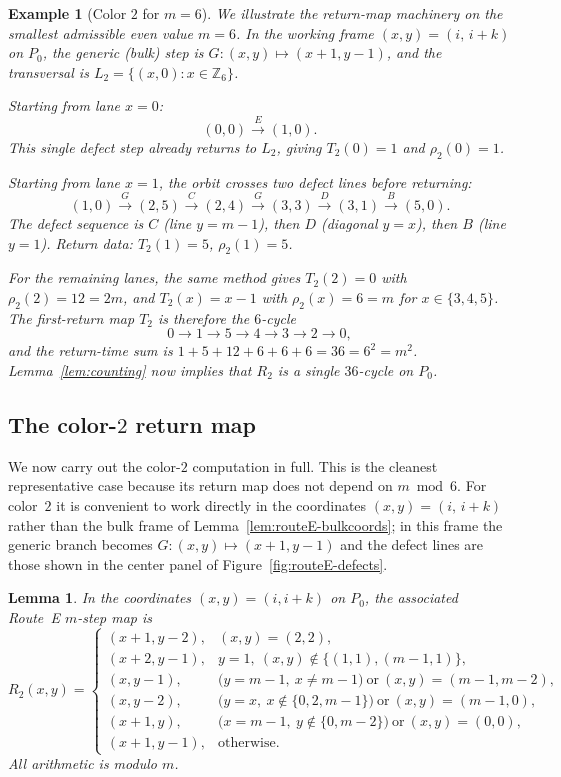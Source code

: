 \documentclass[11pt]{article}
\newtheorem{lemma}{Lemma}
\newtheorem{example}{Example}
\begin{document}
\begin{example}[Color $2$ for $m=6$]\label{ex:m6-color2}
We illustrate the return-map machinery on the smallest admissible even value $m=6$.
In the working frame $(x,y)=(i,\,i+k)$ on $P_0$, the generic (bulk) step is $G\colon(x,y)\mapsto(x+1,y-1)$, and the transversal is $L_2=\{(x,0):x\in\mathbb Z_6\}$.

Starting from lane $x=0$:
\[
(0,0)\xrightarrow{E}(1,0).
\]
This single defect step already returns to $L_2$, giving $T_2(0)=1$ and $\rho_2(0)=1$.

Starting from lane $x=1$, the orbit crosses two defect lines before returning:
\[
(1,0)\xrightarrow{G}(2,5)\xrightarrow{C}(2,4)\xrightarrow{G}(3,3)
\xrightarrow{D}(3,1)\xrightarrow{B}(5,0).
\]
The defect sequence is $C$ (line $y=m{-}1$), then $D$ (diagonal $y=x$), then $B$ (line $y=1$).
Return data: $T_2(1)=5$, $\rho_2(1)=5$.

For the remaining lanes, the same method gives $T_2(2)=0$ with $\rho_2(2)=12=2m$, and $T_2(x)=x-1$ with $\rho_2(x)=6=m$ for $x\in\{3,4,5\}$.
The first-return map $T_2$ is therefore the $6$-cycle
\[
0\to 1\to 5\to 4\to 3\to 2\to 0,
\]
and the return-time sum is $1+5+12+6+6+6=36=6^2=m^2$.
Lemma~\ref{lem:counting} now implies that $R_2$ is a single $36$-cycle on $P_0$.
\end{example}

\subsection{The color-$2$ return map}\label{sec:even-r2}
We now carry out the color-$2$ computation in full.
This is the cleanest representative case because its return map does not depend on $m\bmod 6$.
For color~$2$ it is convenient to work directly in the coordinates $(x,y)=(i,\,i+k)$ rather than the bulk frame of Lemma~\ref{lem:routeE-bulkcoords}; in this frame the generic branch becomes $G\colon(x,y)\mapsto(x+1,y-1)$ and the defect lines are those shown in the center panel of Figure~\ref{fig:routeE-defects}.

\begin{lemma}\label{lem:R2-main-xy}
In the coordinates $(x,y)=(i,i+k)$ on $P_0$, the associated Route~E $m$-step map is
\[
R_2(x,y)=
\begin{cases}
(x+1,y-2),&(x,y)=(2,2),\\
(x+2,y-1),&y=1,\ (x,y)\notin\{(1,1),(m-1,1)\},\\
(x,y-1),&\bigl(y=m-1,\ x\neq m-1\bigr)\ \text{or}\ (x,y)=(m-1,m-2),\\
(x,y-2),&\bigl(y=x,\ x\notin\{0,2,m-1\}\bigr)\ \text{or}\ (x,y)=(m-1,0),\\
(x+1,y),&\bigl(x=m-1,\ y\notin\{0,m-2\}\bigr)\ \text{or}\ (x,y)=(0,0),\\
(x+1,y-1),&\text{otherwise}.
\end{cases}
\]
All arithmetic is modulo $m$.
\end{lemma}
\end{document}
